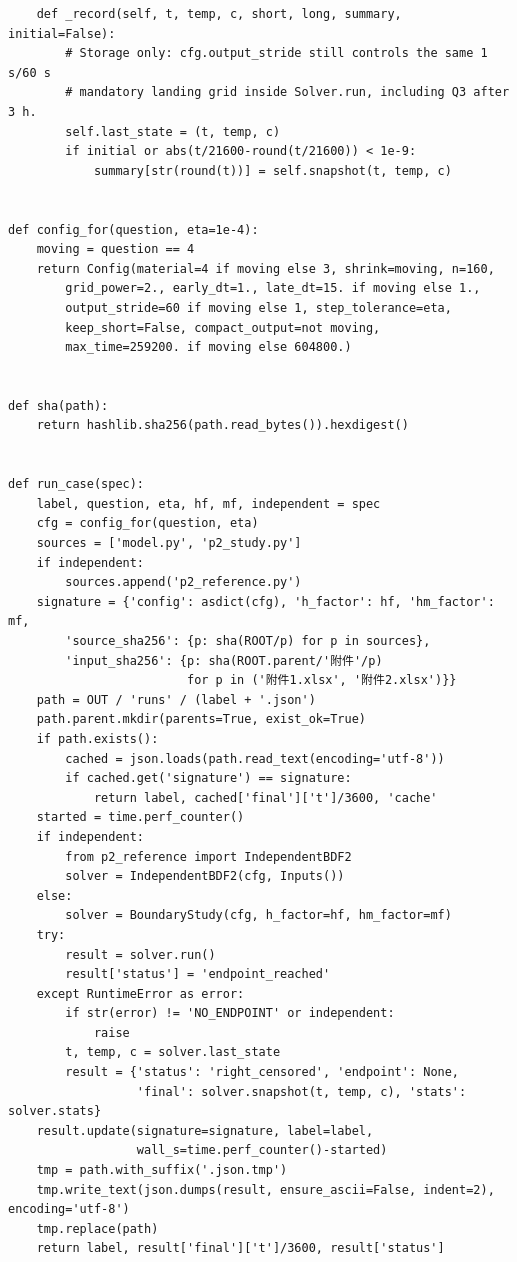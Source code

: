 \begin{verbatim}
    def _record(self, t, temp, c, short, long, summary, initial=False):
        # Storage only: cfg.output_stride still controls the same 1 s/60 s
        # mandatory landing grid inside Solver.run, including Q3 after 3 h.
        self.last_state = (t, temp, c)
        if initial or abs(t/21600-round(t/21600)) < 1e-9:
            summary[str(round(t))] = self.snapshot(t, temp, c)


def config_for(question, eta=1e-4):
    moving = question == 4
    return Config(material=4 if moving else 3, shrink=moving, n=160,
        grid_power=2., early_dt=1., late_dt=15. if moving else 1.,
        output_stride=60 if moving else 1, step_tolerance=eta,
        keep_short=False, compact_output=not moving,
        max_time=259200. if moving else 604800.)


def sha(path):
    return hashlib.sha256(path.read_bytes()).hexdigest()


def run_case(spec):
    label, question, eta, hf, mf, independent = spec
    cfg = config_for(question, eta)
    sources = ['model.py', 'p2_study.py']
    if independent:
        sources.append('p2_reference.py')
    signature = {'config': asdict(cfg), 'h_factor': hf, 'hm_factor': mf,
        'source_sha256': {p: sha(ROOT/p) for p in sources},
        'input_sha256': {p: sha(ROOT.parent/'附件'/p)
                         for p in ('附件1.xlsx', '附件2.xlsx')}}
    path = OUT / 'runs' / (label + '.json')
    path.parent.mkdir(parents=True, exist_ok=True)
    if path.exists():
        cached = json.loads(path.read_text(encoding='utf-8'))
        if cached.get('signature') == signature:
            return label, cached['final']['t']/3600, 'cache'
    started = time.perf_counter()
    if independent:
        from p2_reference import IndependentBDF2
        solver = IndependentBDF2(cfg, Inputs())
    else:
        solver = BoundaryStudy(cfg, h_factor=hf, hm_factor=mf)
    try:
        result = solver.run()
        result['status'] = 'endpoint_reached'
    except RuntimeError as error:
        if str(error) != 'NO_ENDPOINT' or independent:
            raise
        t, temp, c = solver.last_state
        result = {'status': 'right_censored', 'endpoint': None,
                  'final': solver.snapshot(t, temp, c), 'stats': solver.stats}
    result.update(signature=signature, label=label,
                  wall_s=time.perf_counter()-started)
    tmp = path.with_suffix('.json.tmp')
    tmp.write_text(json.dumps(result, ensure_ascii=False, indent=2), encoding='utf-8')
    tmp.replace(path)
    return label, result['final']['t']/3600, result['status']



\end{verbatim}

